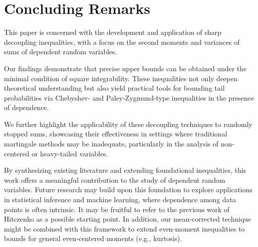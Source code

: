 \documentclass[ECP]{ejpecp} %
\begin{document}


 
\section{Concluding Remarks}
\label{sec: concluding remarks}
This paper is concerned with the  development and application of sharp decoupling inequalities, with a focus on the second moments and variances of sums of dependent random variables.

Our findings demonstrate that precise upper bounds can be obtained under the minimal condition of square integrability. These inequalities not only deepen theoretical understanding but also yield practical tools for bounding tail probabilities via Chebyshev- and Paley-Zygmund-type inequalities in the presence of dependence.

We further highlight the applicability of these decoupling techniques to randomly stopped sums, showcasing their effectiveness in settings where traditional martingale methods may be inadequate, particularly in the analysis of non-centered or heavy-tailed variables.

By synthesizing existing literature and extending foundational inequalities, this work offers a meaningful contribution to the study of dependent random variables. Future research may build upon this foundation to explore applications in statistical inference and machine learning, where dependence among data points is often intrinsic. It may be fruitful to refer to the previous work of Hitczenko \cite{MR1258886} as a possible starting point. In addition, our mean-corrected technique might be combined with this framework to extend even-moment inequalities to bounds for general even-centered moments (e.g., kurtosis).



\end{document}
